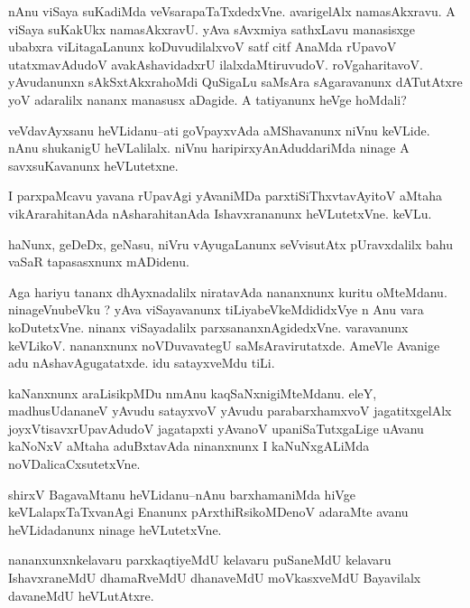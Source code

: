 \documentclass{article}
\begin{document}
\begin{mn}%
nAnu viSaya suKadiMda veVsarapaTaTxdedxVne. avarigelAlx namasAkxravu. A viSaya suKakUkx 
namasAkxravU. yAva sAvxmiya sathxLavu manasisxge ubabxra viLitagaLanunx koDuvudilalxvoV 
satf citf AnaMda rUpavoV utatxmavAdudoV avakAshavidadxrU ilalxdaMtiruvudoV. 
roVgaharitavoV. yAvudanunxn sAkSxtAkxrahoMdi QuSigaLu saMsAra sAgaravanunx dATutAtxre yoV 
adaralilx nananx manasusx aDagide. A tatiyanunx heVge hoMdali?
\end{mn}

\begin{mn}%
veVdavAyxsanu heVLidanu--ati goVpayxvAda aMShavanunx niVnu keVLide. nAnu shukanigU 
heVLalilalx. niVnu haripirxyAnAduddariMda ninage A savxsuKavanunx heVLutetxne.
\end{mn}

\begin{mn}%
I parxpaMcavu yavana rUpavAgi yAvaniMDa parxtiSiThxvtavAyitoV aMtaha vikArarahitanAda 
nAsharahitanAda Ishavxrananunx heVLutetxVne. keVLu.
\end{mn}

\begin{mn}%
haNunx, geDeDx, geNasu, niVru vAyugaLanunx seVvisutAtx pUravxdalilx bahu vaSaR 
tapasasxnunx mADidenu.
\end{mn}

\begin{mn}%
Aga hariyu tananx dhAyxnadalilx niratavAda nananxnunx kuritu oMteMdanu. ninageVnubeVku ? 
yAva viSayavanunx tiLiyabeVkeMdididxVye n Anu vara koDutetxVne. ninanx viSayadalilx 
parxsananxnAgidedxVne. varavanunx keVLikoV. nananxnunx noVDuvavategU saMsAravirutatxde. 
AmeVle Avanige adu nAshavAgugatatxde. idu satayxveMdu tiLi.
\end{mn}

\begin{mn}%
kaNanxnunx araLisikpMDu nmAnu kaqSaNxnigiMteMdanu. eleY, madhusUdananeV yAvudu satayxvoV 
yAvudu parabarxhamxvoV jagatitxgelAlx joyxVtisavxrUpavAdudoV jagatapxti yAvanoV 
upaniSaTutxgaLige uAvanu kaNoNxV aMtaha aduBxtavAda ninanxnunx I kaNuNxgALiMda 
noVDalicaCxsutetxVne.
\end{mn}

\begin{mn}%
shirxV BagavaMtanu heVLidanu--nAnu barxhamaniMda hiVge keVLalapxTaTxvanAgi Enanunx 
pArxthiRsikoMDenoV adaraMte avanu heVLidadanunx ninage heVLutetxVne.
\end{mn}

\begin{mn}%
nananxunxnkelavaru parxkaqtiyeMdU kelavaru puSaneMdU kelavaru IshavxraneMdU dhamaRveMdU 
dhanaveMdU moVkasxveMdU Bayavilalx davaneMdU heVLutAtxre.
\end{mn}
\end{document}
